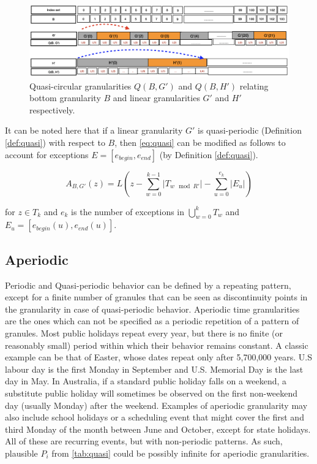 \documentclass[12pt]{article}
\begin{document}
\begin{figure}

{\centering \includegraphics[width=1\linewidth]{Figs/quasi-circular-example} 

}

\caption{Quasi-circular granularities $Q(B, G')$ and $Q(B, H')$ relating bottom granularity $B$ and linear granularities $G'$ and $H'$ respectively.}\label{fig:quasi-circular-example}
\end{figure}

It can be noted here that if a linear granularity \(G'\) is quasi-periodic (Definition \autoref{def:quasi}) with respect to \(B\), then \autoref{eq:quasi} can be modified as follows to account for exceptions \(E = [e_{begin}, e_{end}]\) (by Definition \autoref{def:quasi}).

\begin{equation}\label{eq6}
A_{B, G'}(z) = L(z - \sum_{w=0}^{k-1}\vert T_{w \mod R'} \vert - \sum_{u=0}^{e_k}\vert E_{u} \vert)
\end{equation}

for \(z \in T_k\) and \(e_k\) is the number of exceptions in \(\bigcup\limits_{w = 0}^{k} T_w\) and \(E_{u} = [e_{begin}(u), e_{end}(u)]\).

\hypertarget{sec:aperiodic-gran-def}{%
\subsection{Aperiodic}\label{sec:aperiodic-gran-def}}

Periodic and Quasi-periodic behavior can be defined by a repeating pattern, except for a finite number of granules that can be seen as discontinuity points in the granularity in case of quasi-periodic behavior. Aperiodic time granularities are the ones which can not be specified as a periodic repetition of a pattern of granules. Most public holidays repeat every year, but there is no finite (or reasonably small) period within which their behavior remains constant. A classic example can be that of Easter, whose dates repeat only after 5,700,000 years. U.S labour day is the first Monday in September and U.S. Memorial Day is the last day in May. In Australia, if a standard public holiday falls on a weekend, a substitute public holiday will sometimes be observed on the first non-weekend day (usually Monday) after the weekend. Examples of aperiodic granularity may also include school holidays or a scheduling event that might cover the first and third Monday of the month between June and October, except for state holidays. All of these are recurring events, but with non-periodic patterns. As such, plausible \(P_i\) from \autoref{tab:quasi} could be possibly infinite for aperiodic granularities.
\end{document}
